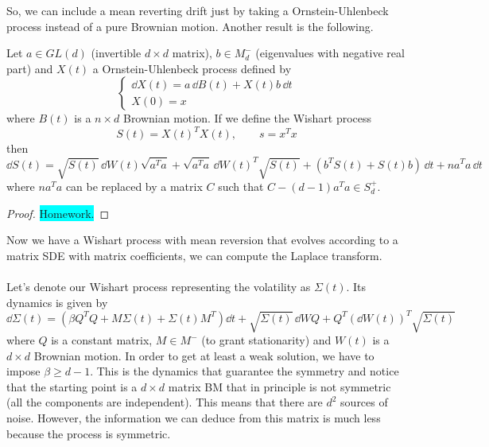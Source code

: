 So, we can include a mean reverting drift just by taking a Ornstein-Uhlenbeck process instead of a pure Brownian motion. Another result is the following.
\begin{theorem}
    Let $a\in GL(d)$ (invertible $d\times d$ matrix), $b\in M_d^-$ (eigenvalues with negative real part) and $X(t)$ a Ornstein-Uhlenbeck process defined by
    \begin{equation}
        \begin{cases}
            \dd X(t) = a\,\dd B(t) + X(t)b\,\dd t \\
            X(0) = x
        \end{cases}
    \end{equation}
    where $B(t)$ is a $n\times d$ Brownian motion. If we define the Wishart process
    \begin{equation}
        S(t) = X(t)^TX(t), \qquad s = x^Tx
    \end{equation}
    then
    \begin{equation}
        \dd S(t) = \sqrt{S(t)}\,\dd W(t)\sqrt{a^Ta} + \sqrt{a^Ta}\,\dd W(t)^T\sqrt{S(t)} + (b^TS(t) + S(t)b)\,\dd t + na^Ta\,\dd t
    \end{equation}
    where $na^Ta$ can be replaced by a matrix $C$ such that $C - (d-1)a^Ta \in S^+_d$.
\end{theorem}
\begin{proof}
    \colorbox{cyan}{Homework.}
\end{proof}
Now we have a Wishart process with mean reversion that evolves according to a matrix SDE with matrix coefficients, we can compute the Laplace transform.\\
\\
Let's denote our Wishart process representing the volatility as $\Sigma(t)$. Its dynamics is given by
\begin{equation}
    \dd\Sigma(t) = (\beta Q^TQ + M\Sigma(t) + \Sigma(t)M^T)\dd t + \sqrt{\Sigma(t)}\,\dd WQ + Q^T(\dd W(t))^T\sqrt{\Sigma(t)}
\end{equation}
where $Q$ is a constant matrix, $M\in M^-$ (to grant stationarity) and $W(t)$ is a $d\times d$ Brownian motion. In order to get at least a weak solution, we have to impose $\beta\ge d-1$. This is the dynamics that guarantee the symmetry and notice that the starting point is a $d\times d$ matrix BM that in principle is not symmetric (all the components are independent). This means that there are $d^2$ sources of noise. However, the information we can deduce from this matrix is much less because the process is symmetric. %
